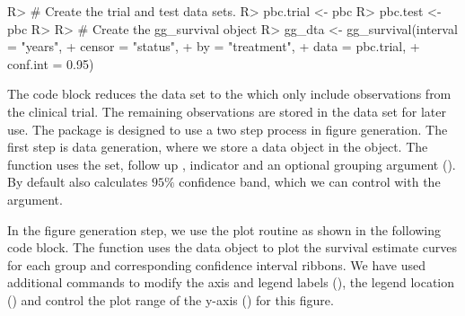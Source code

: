 \documentclass[nojss]{jss}
\begin{document}
\begin{Schunk}
\begin{Sinput}
R> # Create the trial and test data sets.
R> pbc.trial <- pbc %
R> pbc.test <- pbc %
R> 
R> # Create the gg_survival object
R> gg_dta <- gg_survival(interval = "years",
+                       censor = "status",
+                       by = "treatment",
+                       data = pbc.trial,
+                       conf.int = 0.95)
\end{Sinput}
\end{Schunk}

The code block reduces the  data set to the  which only include observations from the clinical trial. The remaining observations are stored in the  data set for later use. The  package is designed to use a two step process in figure generation. The first step is data generation, where we store a  data object in the  object. The  function uses the  set, follow up ,  indicator and an optional grouping argument (). By default  also calculates $95\%$ confidence band, which we can control with the  argument.

In the figure generation step, we use the  plot routine  as shown in the following code block. The  function uses the  data object to plot the survival estimate curves for each group and corresponding confidence interval ribbons. We have used additional  commands to modify the axis and legend labels (), the legend location () and control the plot range of the y-axis () for this figure.
\end{document}
